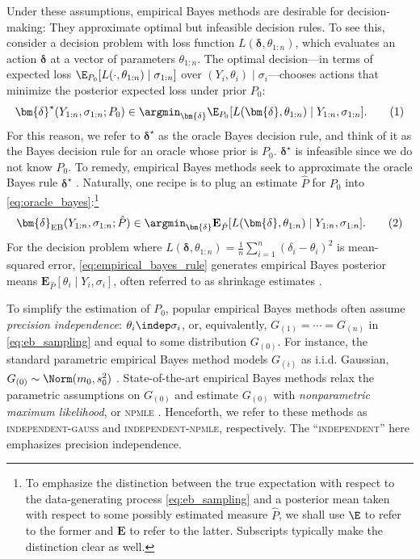 \documentclass[12pt, reqno]{amsart}
\newcommand\numberthis{\addtocounter{equation}{1}\tag{\theequation}}
\newcommand{\indepnpmle}{\textsc{independent-npmle}}
\newcommand{\PE}{\mathbf{E}}
\newcommand{\EB}{\mathrm{EB}}
\newcommand{\npmle}{\textsc{npmle}}
\newcommand{\bdelta}{\bm{\delta}}
\newcommand{\indepgauss}{\textsc{independent-gauss}}
\numberwithin{equation}{section}
\begin{document}
Under these assumptions, empirical Bayes methods are desirable for decision-making: They
approximate optimal but infeasible decision rules. To see this,  consider a decision
problem with loss function $L(\bdelta, \theta_{1:n})$, which evaluates an action $\bdelta$
at a vector of parameters $\theta_{1:n}$. The optimal decision---in terms of expected
loss $\E_{P_0}[L(\cdot, \theta_{1:n}) \mid \sigma_{1:n}]$ over $(Y_i,\theta_i) \mid
\sigma_i$---chooses actions that minimize the posterior expected loss under prior $P_0$: \[
\bdelta^\star(Y_{1:n}, \sigma_{1:n}; P_0) \in \argmin_{\bdelta} \E_{P_0}[L(\bdelta,
\theta_{1:n})
\mid Y_{1:n}, \sigma_{1:n}]. \numberthis \label{eq:oracle_bayes}
\]
For this reason, we refer to $\bdelta^\star$ as the oracle Bayes decision rule, and
think of it as the Bayes decision rule for an oracle whose prior is $P_0$. $\bdelta^\star$
is infeasible since we do not know
$P_0$. To remedy, empirical Bayes methods seek to approximate the oracle Bayes rule
$\bdelta^\star$%
. Naturally, one recipe is to plug an estimate $\hat P$ for $P_0$ into
\eqref{eq:oracle_bayes}:\footnote{To
emphasize the distinction between the true
expectation with respect to the data-generating process
\eqref{eq:eb_sampling} and a posterior mean taken with respect to some possibly estimated
measure $\hat P$, we shall use $\E$ to refer to the former and $\PE$ to refer to the
latter. Subscripts typically make the distinction clear as well.
} \[
\bdelta_{\EB} (Y_{1:n}, \sigma_{1:n}; \hat P) \in \argmin_{\bdelta} \PE_{\hat P}[L
(\bdelta,
\theta_{1:n})
\mid Y_{1:n}, \sigma_{1:n}]. \numberthis \label{eq:empirical_bayes_rule}
\]
For the decision problem where $L(\bdelta, \theta_{1:n}) = \frac{1}{n}\sum_
{i=1}^n (\delta_i - \theta_i)^2$ is mean-squared error, 
\eqref{eq:empirical_bayes_rule} generates empirical Bayes posterior means $\PE_{\hat P}
 [\theta_i \mid Y_i, \sigma_i]$, often referred to as shrinkage estimates 
 \citep{james1992estimation,efron1973stein}.

 To simplify the estimation of $P_0$, popular empirical
Bayes methods often assume \emph{precision independence}: $\theta_i \indep \sigma_i$, or,
equivalently, $G_{(1)} =
\cdots = G_{(n)}$ in \eqref{eq:eb_sampling} and equal to some distribution $G_{(0)}$. For
 instance, the standard parametric empirical Bayes method models $G_{(i)}$ as i.i.d.
 Gaussian, $G_{ (0)} \sim
\Norm(m_0, s_0^2)$ \citep{morris1983parametric}. State-of-the-art empirical Bayes methods
 relax the parametric assumptions on $G_{(0)}$ and estimate $G_{(0)}$ with
\emph{nonparametric maximum likelihood}, or \npmle{}
\citep{jiang2020general,gilraine2020new,soloff2021multivariate}. Henceforth, we refer to
these methods as \indepgauss{} and \indepnpmle{}, respectively. The
``\textsc{independent}'' here emphasizes precision independence.
\end{document}

